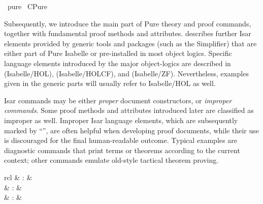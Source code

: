 %
\begin{isabellebody}%
\def\isabellecontext{pure}%
%
\isadelimtheory
\isanewline
\isanewline
%
\endisadelimtheory
%
\isatagtheory
{}\isamarkupfalse%
\ pure\isanewline
{}\ CPure\isanewline
{}%
\endisatagtheory
{\isafoldtheory}%
%
\isadelimtheory
%
\endisadelimtheory
%
\isamarkuptrue%
%
\begin{isamarkuptext}%
Subsequently, we introduce the main part of Pure theory and proof
  commands, together with fundamental proof methods and attributes.
   describes further Isar elements provided by
  generic tools and packages (such as the Simplifier) that are either
  part of Pure Isabelle or pre-installed in most object logics.
  Specific language elements introduced by the major object-logics are
  described in  (Isabelle/HOL), 
  (Isabelle/HOLCF), and  (Isabelle/ZF).  Nevertheless,
  examples given in the generic parts will usually refer to
  Isabelle/HOL as well.

  \medskip Isar commands may be either \emph{proper} document
  constructors, or \emph{improper commands}.  Some proof methods and
  attributes introduced later are classified as improper as well.
  Improper Isar language elements, which are subsequently marked by
  ``\isa{{\isachardoublequote}\isactrlsup {\isacharasterisk}{\isachardoublequote}}'', are often helpful when developing proof
  documents, while their use is discouraged for the final
  human-readable outcome.  Typical examples are diagnostic commands
  that print terms or theorems according to the current context; other
  commands emulate old-style tactical theorem proving.%
\end{isamarkuptext}%
\isamarkuptrue%
%
\isamarkuptrue%
%
\isamarkuptrue%
%
\begin{isamarkuptext}%
\begin{matharray}{rcl}
    \mbox{} & : &  \\
    \mbox{} & : &  \\
    \mbox{} & : &  \\
  \end{matharray}


\end{isamarkuptext}
\end{isabellebody}
